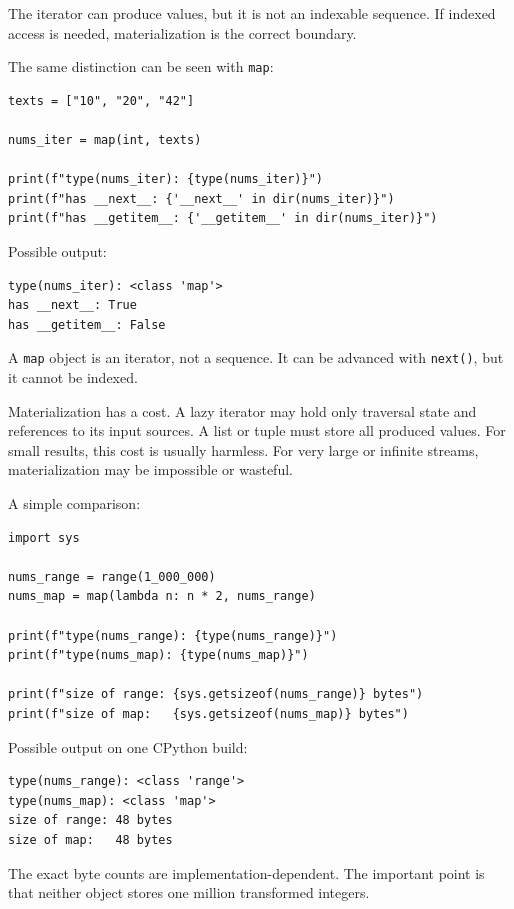 \documentclass[a4paper,twoside]{report}
\begin{document}
The iterator can produce values, but it is not an indexable sequence. If indexed access is needed, materialization is the correct boundary.

The same distinction can be seen with \texttt{map}:

\begin{verbatim}
texts = ["10", "20", "42"]

nums_iter = map(int, texts)

print(f"type(nums_iter): {type(nums_iter)}")
print(f"has __next__: {'__next__' in dir(nums_iter)}")
print(f"has __getitem__: {'__getitem__' in dir(nums_iter)}")
\end{verbatim}

Possible output:

\begin{verbatim}
type(nums_iter): <class 'map'>
has __next__: True
has __getitem__: False
\end{verbatim}

A \texttt{map} object is an iterator, not a sequence. It can be advanced with \texttt{next()}, but it cannot be indexed.

Materialization has a cost. A lazy iterator may hold only traversal state and references to its input sources. A list or tuple must store all produced values. For small results, this cost is usually harmless. For very large or infinite streams, materialization may be impossible or wasteful.

A simple comparison:

\begin{verbatim}
import sys

nums_range = range(1_000_000)
nums_map = map(lambda n: n * 2, nums_range)

print(f"type(nums_range): {type(nums_range)}")
print(f"type(nums_map): {type(nums_map)}")

print(f"size of range: {sys.getsizeof(nums_range)} bytes")
print(f"size of map:   {sys.getsizeof(nums_map)} bytes")
\end{verbatim}

Possible output on one CPython build:

\begin{verbatim}
type(nums_range): <class 'range'>
type(nums_map): <class 'map'>
size of range: 48 bytes
size of map:   48 bytes
\end{verbatim}

The exact byte counts are implementation-dependent. The important point is that neither object stores one million transformed integers.
\end{document}
